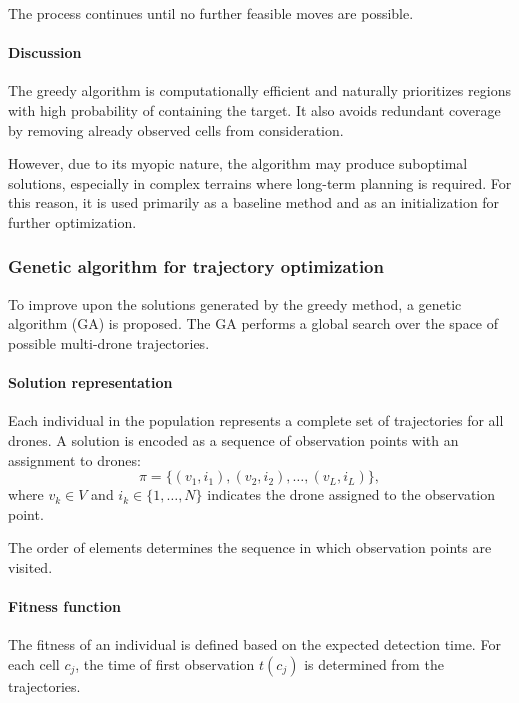 \documentclass[english]{projectreport}
\begin{document}
The process continues until no further feasible moves are possible.

\paragraph{Discussion}

The greedy algorithm is computationally efficient and naturally prioritizes regions with high probability of containing the target. It also avoids redundant coverage by removing already observed cells from consideration.

However, due to its myopic nature, the algorithm may produce suboptimal solutions, especially in complex terrains where long-term planning is required. For this reason, it is used primarily as a baseline method and as an initialization for further optimization.

\subsubsection{Genetic algorithm for trajectory optimization}

To improve upon the solutions generated by the greedy method, a genetic algorithm (GA) is proposed. The GA performs a global search over the space of possible multi-drone trajectories.

\paragraph{Solution representation}

Each individual in the population represents a complete set of trajectories for all drones. A solution is encoded as a sequence of observation points with an assignment to drones:
\[
\pi = \{(v_{1}, i_{1}), (v_{2}, i_{2}), \dots, (v_{L}, i_{L})\},
\]
where \(v_k \in V\) and \(i_k \in \{1, \dots, N\}\) indicates the drone assigned to the observation point.

The order of elements determines the sequence in which observation points are visited.

\paragraph{Fitness function}

The fitness of an individual is defined based on the expected detection time. For each cell \(c_j\), the time of first observation \(t(c_j)\) is determined from the trajectories.
\end{document}
